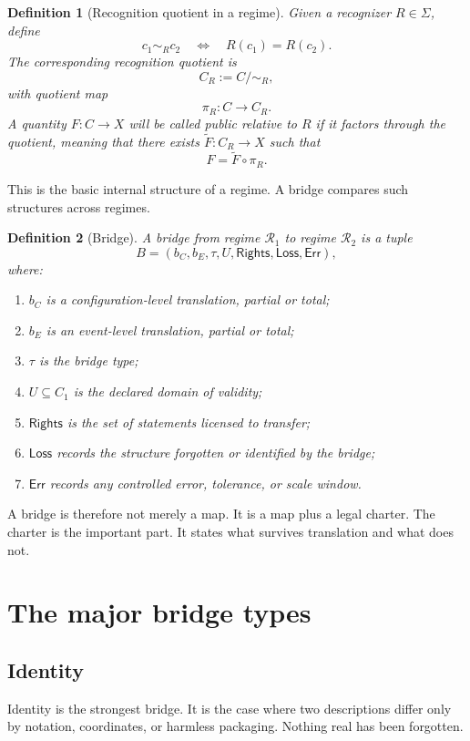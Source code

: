\documentclass[11pt]{article}
\newtheorem{definition}{Definition}
\begin{document}
\begin{definition}[Recognition quotient in a regime]
Given a recognizer $R\in\Sigma$, define
\[
c_1 \sim_R c_2
\quad\Longleftrightarrow\quad
R(c_1)=R(c_2).
\]
The corresponding recognition quotient is
\[
C_R := C/{\sim_R},
\]
with quotient map
\[
\pi_R:C\to C_R.
\]
A quantity $F:C\to X$ will be called \emph{public} relative to $R$ if it factors through the quotient, meaning that there exists $\widetilde{F}:C_R\to X$ such that
\[
F=\widetilde{F}\circ \pi_R.
\]
\end{definition}

This is the basic internal structure of a regime. A bridge compares such structures across regimes.

\begin{definition}[Bridge]
A bridge from regime $\mathcal{R}_1$ to regime $\mathcal{R}_2$ is a tuple
\[
B=(b_C,b_E,\tau,U,\mathsf{Rights},\mathsf{Loss},\mathsf{Err}),
\]
where:
\begin{enumerate}
    \item $b_C$ is a configuration-level translation, partial or total;
    \item $b_E$ is an event-level translation, partial or total;
    \item $\tau$ is the bridge type;
    \item $U\subseteq C_1$ is the declared domain of validity;
    \item $\mathsf{Rights}$ is the set of statements licensed to transfer;
    \item $\mathsf{Loss}$ records the structure forgotten or identified by the bridge;
    \item $\mathsf{Err}$ records any controlled error, tolerance, or scale window.
\end{enumerate}
\end{definition}

A bridge is therefore not merely a map. It is a map plus a legal charter. The charter is the important part. It states what survives translation and what does not.

\section{The major bridge types}

\subsection*{Identity}

Identity is the strongest bridge. It is the case where two descriptions differ only by notation, coordinates, or harmless packaging. Nothing real has been forgotten.
\end{document}
